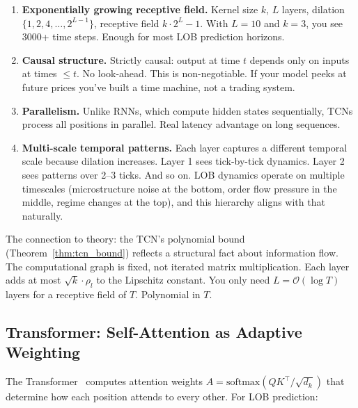 \documentclass[11pt]{article}
\theoremstyle{definition}
\theoremstyle{remark}
\newcommand{\cO}{\mathcal{O}}
\begin{document}
\begin{enumerate}
    \item \textbf{Exponentially growing receptive field.}  Kernel size $k$, $L$ layers, dilation $\{1, 2, 4, \ldots, 2^{L-1}\}$, receptive field $k \cdot 2^L - 1$.  With $L = 10$ and $k = 3$, you see 3000+ time steps.  Enough for most LOB prediction horizons.

    \item \textbf{Causal structure.}  Strictly causal: output at time $t$ depends only on inputs at times $\leq t$.  No look-ahead.  This is non-negotiable.  If your model peeks at future prices you've built a time machine, not a trading system.

    \item \textbf{Parallelism.}  Unlike RNNs, which compute hidden states sequentially, TCNs process all positions in parallel.  Real latency advantage on long sequences.

    \item \textbf{Multi-scale temporal patterns.}  Each layer captures a different temporal scale because dilation increases.  Layer 1 sees tick-by-tick dynamics.  Layer 2 sees patterns over 2--3 ticks.  And so on.  LOB dynamics operate on multiple timescales (microstructure noise at the bottom, order flow pressure in the middle, regime changes at the top), and this hierarchy aligns with that naturally.
\end{enumerate}

The connection to theory: the TCN's polynomial bound (Theorem~\ref{thm:tcn_bound}) reflects a structural fact about information flow.
The computational graph is fixed, not iterated matrix multiplication.
Each layer adds at most $\sqrt{k} \cdot \rho_l$ to the Lipschitz constant.
You only need $L = \cO(\log T)$ layers for a receptive field of $T$.
Polynomial in $T$.

\subsection{Transformer: Self-Attention as Adaptive Weighting}\label{sec:arch:transformer}

The Transformer~\citep{vaswani2017attention} computes attention weights $A = \mathrm{softmax}(QK^\top / \sqrt{d_k})$ that determine how each position attends to every other.
For LOB prediction:
\end{document}
